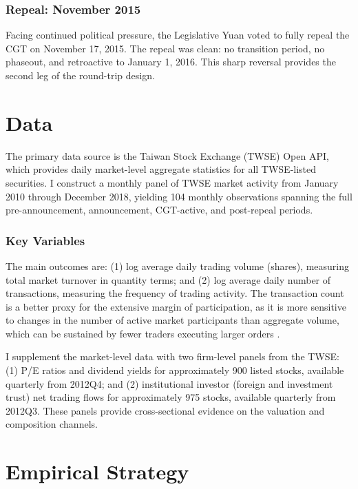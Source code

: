 \documentclass[12pt]{article}
\begin{document}
\subsubsection*{Repeal: November 2015} Facing continued political pressure, the Legislative Yuan voted to fully repeal the CGT on November 17, 2015. The repeal was clean: no transition period, no phaseout, and retroactive to January 1, 2016. This sharp reversal provides the second leg of the round-trip design.


\section{Data}

The primary data source is the Taiwan Stock Exchange (TWSE) Open API, which provides daily market-level aggregate statistics for all TWSE-listed securities. I construct a monthly panel of TWSE market activity from January 2010 through December 2018, yielding 104 monthly observations spanning the full pre-announcement, announcement, CGT-active, and post-repeal periods.

\subsubsection*{Key Variables} The main outcomes are: (1) log average daily trading volume (shares), measuring total market turnover in quantity terms; and (2) log average daily number of transactions, measuring the frequency of trading activity. The transaction count is a better proxy for the extensive margin of participation, as it is more sensitive to changes in the number of active market participants than aggregate volume, which can be sustained by fewer traders executing larger orders \citep{lo2000trading}.

I supplement the market-level data with two firm-level panels from the TWSE: (1) P/E ratios and dividend yields for approximately 900 listed stocks, available quarterly from 2012Q4; and (2) institutional investor (foreign and investment trust) net trading flows for approximately 975 stocks, available quarterly from 2012Q3. These panels provide cross-sectional evidence on the valuation and composition channels.




\section{Empirical Strategy}
\end{document}

